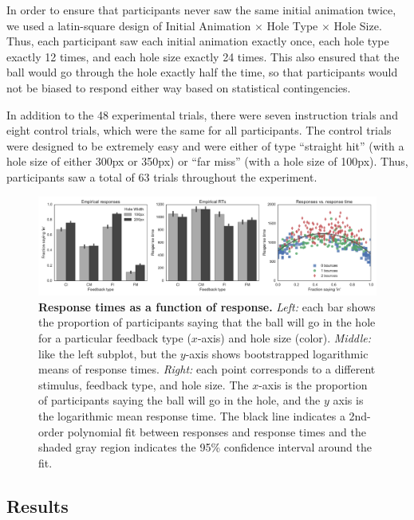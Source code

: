\documentclass[10pt,letterpaper]{article}
\begin{document}
In order to ensure that participants never saw the same initial animation twice, we used a latin-square design of Initial Animation $\times$ Hole Type $\times$ Hole Size. Thus, each participant saw each initial animation exactly once, each hole type exactly 12 times, and each hole size exactly 24 times. This also ensured that the ball would go through the hole exactly half the time, so that participants would not be biased to respond either way based on statistical contingencies.

In addition to the 48 experimental trials, there were seven instruction trials and eight control trials, which were the same for all participants. The control trials were designed to be extremely easy and were either of type ``straight hit'' (with a hole size of either 300px or 350px) or ``far miss'' (with a hole size of 100px). Thus, participants saw a total of 63 trials throughout the experiment.

\begin{figure}[t]
    \begin{center}
        \includegraphics[width=\textwidth]{figures/hole_empirical_results.pdf}
        \caption{\textbf{Response times as a function of response.} \emph{Left:} each bar shows the proportion of participants saying that the ball will go in the hole for a particular feedback type ($x$-axis) and hole size (color). \emph{Middle:} like the left subplot, but the $y$-axis shows bootstrapped logarithmic means of response times. \emph{Right:} each point corresponds to a different stimulus, feedback type, and hole size.  The $x$-axis is the proportion of participants saying the ball will go in the hole, and the $y$ axis is the logarithmic mean response time. The black line indicates a 2nd-order polynomial fit between responses and response times and the shaded gray region indicates the 95\% confidence interval around the fit.}
        \label{fig:pct-vs-rt}
    \end{center}
\end{figure}

\subsection{Results}
\end{document}

